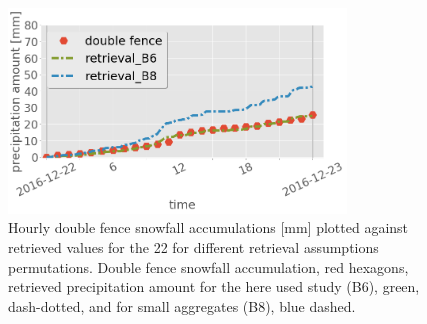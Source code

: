 %
\begin{figure}[t]
	\centering
	\includegraphics[width=0.8\textwidth]{./fig_obs_ret/20161222}
	\caption{Hourly double fence snowfall accumulations [mm] plotted against retrieved values for the \SI{22}{\dec} for different retrieval assumptions permutations. Double fence snowfall accumulation, red hexagons, retrieved precipitation amount for the here used study (B6), green, dash-dotted, and for small aggregates (B8), blue dashed.}\label{fig:ret_sensitivity}
\end{figure}
%
\noindent
\\
